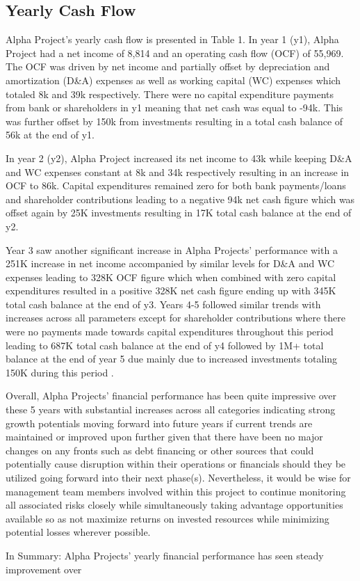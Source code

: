 

\subsection{Yearly Cash Flow}\label{sec:title}

Alpha Project's yearly cash flow is presented in Table 1. In year 1 (y1), Alpha Project had a net income of 8,814 and an operating cash flow (OCF) of 55,969. The OCF was driven by net income and partially offset by depreciation and amortization (D\&A) expenses as well as working capital (WC) expenses which totaled 8k and 39k respectively. There were no capital expenditure payments from bank or shareholders in y1 meaning that net cash was equal to -94k. This was further offset by 150k from investments resulting in a total cash balance of 56k at the end of y1. 

In year 2 (y2), Alpha Project increased its net income to 43k while keeping D\&A and WC expenses constant at 8k and 34k respectively resulting in an increase in OCF to 86k. Capital expenditures remained zero for both bank payments/loans and shareholder contributions leading to a negative 94k net cash figure which was offset again by 25K investments resulting in 17K total cash balance at the end of y2. 

Year 3 saw another significant increase in Alpha Projects' performance with a 251K increase in net income accompanied by similar levels for D\&A and WC expenses leading to 328K OCF figure which when combined with zero capital expenditures resulted in a positive 328K net cash figure ending up with 345K total cash balance at the end of y3.  
Years 4-5 followed similar trends with increases across all parameters except for shareholder contributions where there were no payments made towards capital expenditures throughout this period leading to 687K total cash balance at the end of y4 followed by 1M+ total balance at the end of year 5 due mainly due to increased investments totaling 150K during this period . 

Overall, Alpha Projects' financial performance has been quite impressive over these 5 years with substantial increases across all categories indicating strong growth potentials moving forward into future years if current trends are maintained or improved upon further given that there have been no major changes on any fronts such as debt financing or other sources that could potentially cause disruption within their operations or financials should they be utilized going forward into their next phase(s). Nevertheless, it would be wise for management team members involved within this project to continue monitoring all associated risks closely while simultaneously taking advantage opportunities available so as not maximize returns on invested resources while minimizing potential losses wherever possible. 

In Summary: Alpha Projects' yearly financial performance has seen steady improvement over